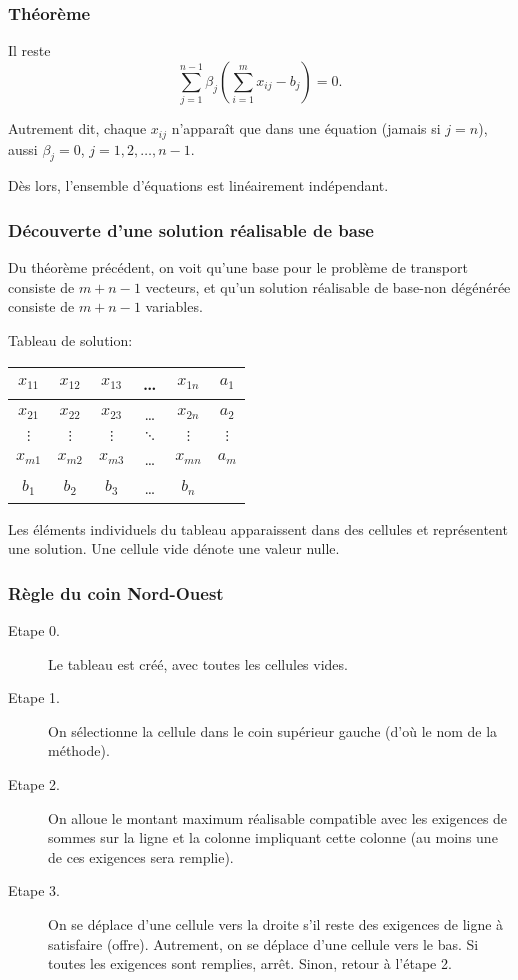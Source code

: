 \documentclass[usepdftitle=false]{beamer}
\begin{document}
\begin{frame}
\frametitle{Théorème}

Il reste
\[
\sum_{j = 1}^{n-1} \beta_j \left( \sum_{i = 1}^m x_{ij} - b_j \right) = 0.
\]

Autrement dit, chaque $x_{ij}$ n'apparaît que dans une équation (jamais si $j=n$), aussi $\beta_j = 0$, $j = 1,2,\ldots,n-1$.

\mbox{}

Dès lors, l'ensemble d'équations est linéairement indépendant.

\end{frame}

\begin{frame}
\frametitle{Découverte d'une solution réalisable de base}

Du théorème précédent, on voit qu'une base pour le problème de transport consiste de $m+n-1$ vecteurs, et qu'un solution réalisable de base-non dégénérée consiste de $m+n-1$ variables.

\mbox{}

Tableau de solution:
\begin{center}
\begin{tabular}{|c|c|c|c|c|c|}
\hline
$x_{11}$ & $x_{12}$ & $x_{13}$ & \ldots & $x_{1n}$ & $a_1$ \\
\hline
$x_{21}$ & $x_{22}$ & $x_{23}$ & \ldots & $x_{2n}$ & $a_2$ \\
\hline
$\vdots$ & $\vdots$ & $\vdots$ & $\ddots$ & $\vdots$ & $\vdots$ \\
\hline
$x_{m1}$ & $x_{m2}$ & $x_{m3}$ & \ldots & $x_{mn}$ & $a_m$ \\
\hline
$b_1$ & $b_2$ & $b_3$ & \ldots & $b_n$ & \\
\hline
\end{tabular}
\end{center}

\mbox{}

Les éléments individuels du tableau apparaissent dans des cellules et représentent une solution. Une cellule vide dénote une valeur nulle.

\end{frame}

\begin{frame}
\frametitle{Règle du coin Nord-Ouest}

\begin{description}
\item[Etape 0.]
Le tableau est créé, avec toutes les cellules vides.
\item[Etape 1.]
On sélectionne la cellule dans le coin supérieur gauche (d'où le nom de la méthode).
\item[Etape 2.]
On alloue le montant maximum réalisable compatible avec les exigences de sommes sur la ligne et la colonne impliquant cette colonne (au moins une de ces exigences sera remplie).
\item[Etape 3.]
On se déplace d'une cellule vers la droite s'il reste des exigences de ligne à satisfaire (offre). Autrement, on se déplace d'une cellule vers le bas. Si toutes les exigences sont remplies, arrêt. Sinon, retour à l'étape 2.
\end{description}

\end{frame}
\end{document}
